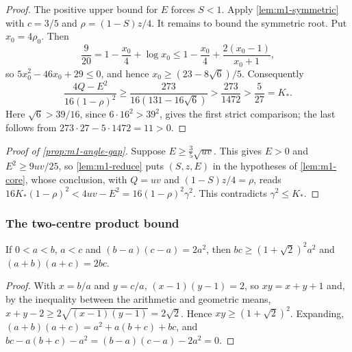 \begin{proof}
The positive upper bound for $E$ forces $S<1$. Apply \cref{lem:m1-symmetric} with $c=3/5$ and
$\rho=(1-S)z/4$. It remains to bound the symmetric root. Put $x_0=4\rho_0$. Then
\[
 \frac9{20}=1-\frac{x_0}{4}+\log x_0
 \le1-\frac{x_0}{4}+\frac{2(x_0-1)}{x_0+1},
\]
so $5x_0^2-46x_0+29\le0$, and hence $x_0\ge(23-8\sqrt6)/5$. Consequently
\[
 \frac{4Q-E^2}{16(1-\rho)^2}
 \ge\frac{273}{16(131-16\sqrt6)}
 >\frac{273}{1472}>\frac5{27}=K_*.
\]
Here $\sqrt6>39/16$, since $6\cdot16^2>39^2$, gives the first strict comparison;
the last follows from $273\cdot27-5\cdot1472=11>0$.
\end{proof}

\begin{proof}[Proof of \cref{prop:m1-angle-gap}]
  Suppose $E\ge\frac35\sqrt{uv}$. This gives $E>0$ and $E^2\ge9uv/25$, so
  \cref{lem:m1-reduce} puts $(S,z,E)$ in the hypotheses of
  \cref{lem:m1-core}, whose conclusion, with $Q=uv$ and $(1-S)z/4=\rho$, reads
  $16K_*(1-\rho)^2<4uv-E^2=16(1-\rho)^2\gamma^2$. This contradicts $\gamma^2\le K_*$.
\end{proof}

\subsubsection{The two-centre product bound}

\begin{lemma}\label{lem:m1-bc}
  If $0<a<b$, $a<c$ and $(b-a)(c-a)=2a^2$, then
  $bc\ge(1+\sqrt2)^2a^2$ and $(a+b)(a+c)=2bc$.
\end{lemma}

\begin{proof}
  With $x=b/a$ and $y=c/a$, $(x-1)(y-1)=2$, so $xy=x+y+1$ and, by the inequality between the
  arithmetic and geometric means, $x+y-2\ge2\sqrt{(x-1)(y-1)}=2\sqrt2$. Hence
  $xy\ge(1+\sqrt2)^2$. Expanding, $(a+b)(a+c)=a^2+a(b+c)+bc$, and
  $bc-a(b+c)-a^2=(b-a)(c-a)-2a^2=0$.
\end{proof}
